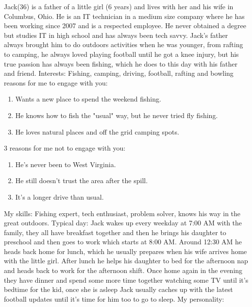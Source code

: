 Jack(36) is a father of a little girl (6 years) and lives with her and his wife in Columbus, Ohio. He is an IT technician in a medium size company where he has been working since 2007 and is a respected employee. He never obtained a degree but studies IT in high school and has always been tech savvy. Jack's father always brought him to do outdoors activities when he was younger, from rafting to camping, he always loved playing football until he got a knee injury, but his true passion has always been fishing, which he does to this day with his father and friend. 
\newline
Interests: Fishing, camping, driving, football, rafting and bowling 
 reasons for me to engage with you:
\begin{enumerate} 
\item Wants a new place to spend the weekend fishing. 
\item He knows how to fish the "usual" way, but he never tried fly fishing.
\item He loves natural places and off the grid camping spots.
\end{enumerate}
3 reasons for me not to engage with you:
\begin{enumerate}
\item He's never been to West Virginia.
\item He still doesn't trust the area after the spill. 
\item It's a longer drive than usual. 
\end{enumerate}
My skills: 
\newline
Fishing expert, tech enthusiast, problem solver, knows his way in the great outdoors. 
\newline
Typical day: 
\newline
Jack wakes up every weekday at 7:00 AM with the family, they all have breakfast together and then he brings his daughter to preschool and then goes to work which starts at 8:00 AM. Around 12:30 AM he heads back home for lunch, which he usually prepares when his wife arrives home with the little girl. After lunch he helps his daughter to bed for the afternoon nap and heads back to work for the afternoon shift. Once home again in the evening they have dinner and spend some more time together watching some TV until it's bedtime for the kid, once she is asleep Jack usually caches up with the latest football updates until it's time for him too to go to sleep. 
\newline
My personality: 
